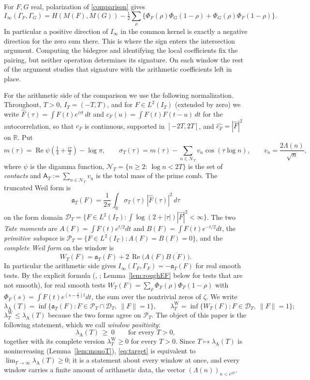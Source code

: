 \documentclass[11pt]{amsart}
\theoremstyle{definition}
\theoremstyle{remark}
\newcommand{\R}{\mathbb R}
\newcommand{\Rel}{\operatorname{Re}}
\newcommand{\PT}{\mathcal P_T}
\newcommand{\IT}{I_T}
\newcommand{\lamW}{\lambda^{\mathrm W}_T}
\newcommand{\lamA}{\lambda_{\mathrm A}(T)}
\newcommand{\sT}{\sigma_T}
\newcommand{\Fh}{\widehat F}
\newcommand{\cF}{c_F}
\newcommand{\NT}{\mathcal N_T}
\newcommand{\Aconst}{\mathsf A_T}
\begin{document}
For $F,G$ real, polarization of \eqref{comparison} gives
\[
 I_\infty(\Gamma_F,\Gamma_G)
 = H(M(F),M(G))-
 \tfrac12\sum_\rho
 \{\Phi_F(\rho)\Phi_G(1-\rho)+\Phi_G(\rho)\Phi_F(1-\rho)\}.
\]
In particular a positive direction of $I_\infty$ in the common kernel is
exactly a negative direction for the zero sum there. This is where the
sign enters the intersection argument. Computing the bidegree and
identifying the local coefficients fix the pairing, but neither operation
determines its signature. On each window the rest of the argument studies
that signature with the arithmetic coefficients left in place.

For the arithmetic side of the comparison we use the following normalization.
Throughout, $T>0$, $\IT=(-T,T)$, and for $F\in L^2(\IT)$ (extended by zero) we write
$\Fh(\tau)=\int F(t)e^{i\tau t}\,dt$ and $\cF(u)=\int F(t)\overline{F(t-u)}\,dt$ for the
autocorrelation, so that $\cF$ is continuous, supported in $[-2T,2T]$, and
$\widehat{\cF}=|\Fh|^2$ on $\R$. Put
\begin{equation}\label{eq:symbol}
m(\tau)=\Rel\psi\!\left(\tfrac14+\tfrac{i\tau}{2}\right)-\log\pi,\qquad
\sT(\tau)=m(\tau)-\sum_{n\in\NT}v_n\cos(\tau\log n),\qquad v_n=\frac{2\Lambda(n)}{\sqrt n},
\end{equation}
where $\psi$ is the digamma function, $\NT=\{n\ge2:\ \log n<2T\}$ is the set of \emph{contacts} and
$\Aconst:=\sum_{n\in\NT}v_n$ is the total mass of the prime comb. The truncated Weil form is
\begin{equation}\label{eq:form}
\mathfrak a_T(F)=\frac1{2\pi}\int_\R\sT(\tau)\,|\Fh(\tau)|^2\,d\tau
\end{equation}
on the form domain $\mathcal D_T=\{F\in L^2(\IT):\int\log(2+|\tau|)|\Fh|^2<\infty\}$. The two \emph{Tate
moments} are $A(F)=\int F(t)e^{t/2}dt$ and $B(F)=\int F(t)e^{-t/2}dt$, the \emph{primitive subspace} is
$\PT=\{F\in L^2(\IT):A(F)=B(F)=0\}$, and the \emph{complete Weil form} on the window is
\begin{equation}\label{eq:W}
W_T(F)=\mathfrak a_T(F)+2\,\Rel\big(A(F)\overline{B(F)}\big).
\end{equation}
In particular the arithmetic side gives $I_\infty(\Gamma_F,\Gamma_F)=-\mathfrak a_T(F)$ for real smooth tests. By the explicit formula (\cite{Weil52}, \cite[Thm.~8.4]{Paper45}; Lemma~\ref{lem:roughEF} below for
tests that are not smooth), for real smooth tests $W_T(F)=\sum_\rho\Phi_F(\rho)\Phi_F(1-\rho)$ with
$\Phi_F(s)=\int F(t)e^{(s-\frac12)t}dt$, the sum over the nontrivial zeros of $\zeta$. We write
\[
\lamA=\inf\{\mathfrak a_T(F):F\in\PT\cap\mathcal D_T,\ \|F\|=1\},\qquad
\lamW=\inf\{W_T(F):F\in\mathcal D_T,\ \|F\|=1\};
\]
$\lamW\le\lamA$ because the two forms agree on $\PT$. The object of this paper is the following
statement, which we call \emph{window positivity}:
\begin{equation}\label{eq:target}
\lamA\ \ge\ 0\qquad\text{for every }T>0 ,
\end{equation}
together with its complete version $\lamW\ge0$ for every $T>0$. Since $T\mapsto\lamA$ is nonincreasing
(Lemma~\ref{lem:monoT}), \eqref{eq:target} is equivalent to $\lim_{T\to\infty}\lamA\ge0$; it is a
statement about every window at once, and every window carries a finite amount of arithmetic data, the
vector $(\Lambda(n))_{n<e^{2T}}$.
\end{document}
